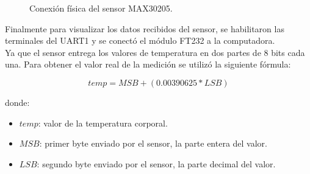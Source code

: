 \begin{figure}[htbp!]
	\centering
	\caption{Conexión física del sensor MAX30205.}
	\label{fig:ConexionFisicaMAX30205}
\end{figure}


Finalmente para visualizar los datos recibidos del sensor, se habilitaron las terminales del UART1 y se conectó el módulo FT232 a la computadora. \\

%
%

Ya que el sensor entrega los valores de temperatura en dos partes de 8 bits cada una. Para obtener el valor real de la medición se utilizó la siguiente fórmula:

\begin{equation}
temp = MSB + (0.00390625 * LSB)
\end{equation}

donde: 
\begin{itemize}
	\item $temp$: valor de la temperatura corporal.
	\item $MSB$: primer byte enviado por el sensor, la parte entera del valor.
	\item $LSB$: segundo byte enviado por el sensor, la parte decimal del valor.
\end{itemize}

\clearpage